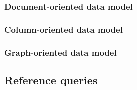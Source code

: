 \subsubsection{Document-oriented data model}
\label{sec:document-data-model}

\subsubsection{Column-oriented data model}
\label{sec:column-data-model}

\subsubsection{Graph-oriented data model}
\label{sec:graph-data-model}

\subsection{Reference queries}
\label{sec:reference-queries}

